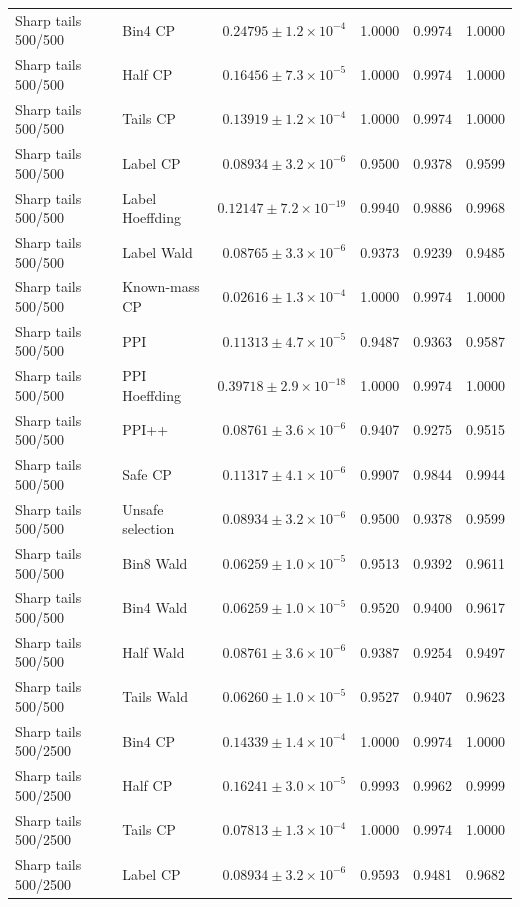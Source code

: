 \begin{longtable}{llrrrr}
Sharp tails 500/500 & Bin4 CP & $0.24795\pm 1.2\times 10^{-4}$ & 1.0000 & 0.9974 & 1.0000 \\
Sharp tails 500/500 & Half CP & $0.16456\pm 7.3\times 10^{-5}$ & 1.0000 & 0.9974 & 1.0000 \\
Sharp tails 500/500 & Tails CP & $0.13919\pm 1.2\times 10^{-4}$ & 1.0000 & 0.9974 & 1.0000 \\
Sharp tails 500/500 & Label CP & $0.08934\pm 3.2\times 10^{-6}$ & 0.9500 & 0.9378 & 0.9599 \\
Sharp tails 500/500 & Label Hoeffding & $0.12147\pm 7.2\times 10^{-19}$ & 0.9940 & 0.9886 & 0.9968 \\
Sharp tails 500/500 & Label Wald & $0.08765\pm 3.3\times 10^{-6}$ & 0.9373 & 0.9239 & 0.9485 \\
Sharp tails 500/500 & Known-mass CP & $0.02616\pm 1.3\times 10^{-4}$ & 1.0000 & 0.9974 & 1.0000 \\
Sharp tails 500/500 & PPI & $0.11313\pm 4.7\times 10^{-5}$ & 0.9487 & 0.9363 & 0.9587 \\
Sharp tails 500/500 & PPI Hoeffding & $0.39718\pm 2.9\times 10^{-18}$ & 1.0000 & 0.9974 & 1.0000 \\
Sharp tails 500/500 & PPI++ & $0.08761\pm 3.6\times 10^{-6}$ & 0.9407 & 0.9275 & 0.9515 \\
Sharp tails 500/500 & Safe CP & $0.11317\pm 4.1\times 10^{-6}$ & 0.9907 & 0.9844 & 0.9944 \\
Sharp tails 500/500 & Unsafe selection & $0.08934\pm 3.2\times 10^{-6}$ & 0.9500 & 0.9378 & 0.9599 \\
Sharp tails 500/500 & Bin8 Wald & $0.06259\pm 1.0\times 10^{-5}$ & 0.9513 & 0.9392 & 0.9611 \\
Sharp tails 500/500 & Bin4 Wald & $0.06259\pm 1.0\times 10^{-5}$ & 0.9520 & 0.9400 & 0.9617 \\
Sharp tails 500/500 & Half Wald & $0.08761\pm 3.6\times 10^{-6}$ & 0.9387 & 0.9254 & 0.9497 \\
Sharp tails 500/500 & Tails Wald & $0.06260\pm 1.0\times 10^{-5}$ & 0.9527 & 0.9407 & 0.9623 \\
Sharp tails 500/2500 & Bin4 CP & $0.14339\pm 1.4\times 10^{-4}$ & 1.0000 & 0.9974 & 1.0000 \\
Sharp tails 500/2500 & Half CP & $0.16241\pm 3.0\times 10^{-5}$ & 0.9993 & 0.9962 & 0.9999 \\
Sharp tails 500/2500 & Tails CP & $0.07813\pm 1.3\times 10^{-4}$ & 1.0000 & 0.9974 & 1.0000 \\
Sharp tails 500/2500 & Label CP & $0.08934\pm 3.2\times 10^{-6}$ & 0.9593 & 0.9481 & 0.9682 \\

\end{longtable}
